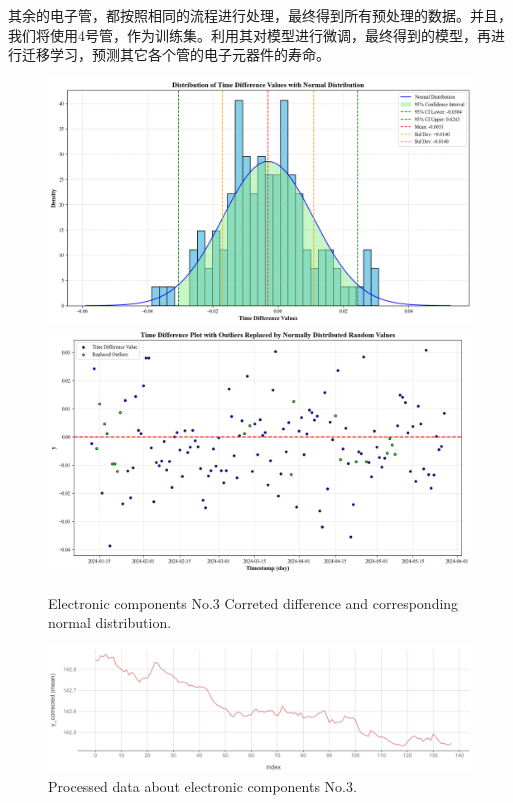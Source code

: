 其余的电子管，都按照相同的流程进行处理，最终得到所有预处理的数据。并且，我们将使用4号管，作为训练集。利用其对模型进行微调，最终得到的模型，再进行迁移学习，预测其它各个管的电子元器件的寿命。

\begin{figure}[H]
	\centering
	\includegraphics[width=\linewidth]{figures/No.3_Corrected_and_Normal_Distribution} 
	\includegraphics[width=\linewidth]{figures/No.3_Corrected_Diff} 
	\caption{Electronic components No.3 Correted difference and corresponding normal distribution.}
	\label{fig:No.3_Corrected_and_Normal_Distribution}
\end{figure}

\begin{figure}[H]
	\centering
	\includegraphics[width=\linewidth]{figures/No.3data_precessed} 
	\caption{Processed data about electronic components No.3.}
	\label{fig:No.3data_precessed}
\end{figure}
